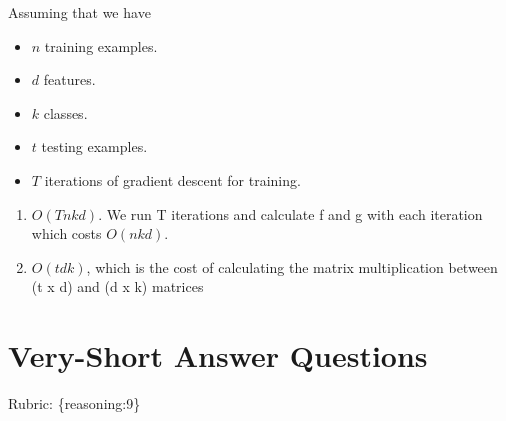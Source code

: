 \documentclass{article}
\def\rubric#1{\gre{Rubric: \{#1\}}}{}
\def\blu#1{{\color{blu}#1}}
\def\gre#1{{\color{gre}#1}}
\def\items#1{\begin{itemize}#1\end{itemize}}
\def\enum#1{\begin{enumerate}#1\end{enumerate}}
\begin{document}
Assuming that we have
\items{
\item $n$ training examples.
\item $d$ features.
\item $k$ classes.
\item $t$ testing examples.
\item $T$ iterations of gradient descent for training.
}
\blu{\enum{
\item $O(Tnkd)$. We run T iterations and calculate f and g with each iteration which costs $O(nkd)$.
\item $O(tdk)$, which is the cost of calculating the matrix multiplication between (t x d) and (d x k) matrices
}}




\section{Very-Short Answer Questions}
\rubric{reasoning:9}
\end{document}
